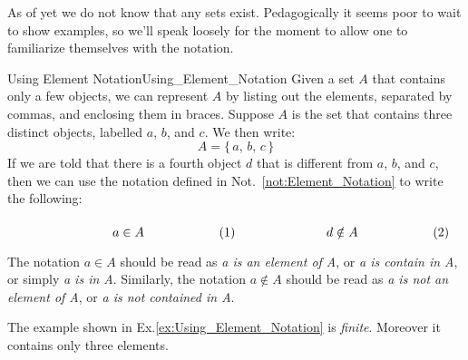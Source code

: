        As of yet we do not know that any sets exist. Pedagogically it seems
        poor to wait to show examples, so we'll speak loosely for the moment
        to allow one to familiarize themselves with the notation.
        \begin{lexample}{Using Element Notation}{Using_Element_Notation}
            Given a set $A$ that contains only a few objects, we
            can represent $A$ by listing out the elements, separated by
            commas, and enclosing them in braces. Suppose $A$ is the set
            that contains three distinct objects, labelled $a$, $b$, and $c$.
            We then write:
            \begin{equation}
                A=\{\,a,\,b,\,c\,\}
            \end{equation}
            If we are told that there is a fourth object $d$ that is different
            from $a$, $b$, and $c$, then we can use the notation defined in
            Not.~\ref{not:Element_Notation} to write the following:
            \par\hfill\par
            \begin{subequations}
                \begin{minipage}[b]{0.49\textwidth}
                    \begin{equation}
                        a\in{A}
                    \end{equation}
                \end{minipage}
                \hfill
                \begin{minipage}[b]{0.49\textwidth}
                    \begin{equation}
                        d\notin{A}
                    \end{equation}
                \end{minipage}
            \end{subequations}
            \par\vspace{2.5ex}
            The notation $a\in{A}$ should be read as
            \textit{a is an element of A}, or
            \textit{a is contain in A}, or simply \textit{a is in A}.
            Similarly, the notation $a\notin{A}$ should be read as
            \textit{a is not an element of A}, or
            \textit{a is not contained in A}.
        \end{lexample}
        The example shown in Ex.\ref{ex:Using_Element_Notation} is
        \textit{finite}. Moreover it contains only three elements.
